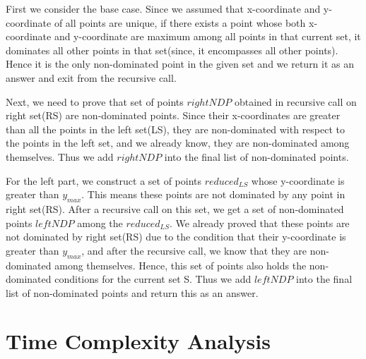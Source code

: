 \documentclass{article}
\begin{document}
First we consider the base case. Since we assumed that x-coordinate and y-coordinate of all points are unique, if there exists a point whose both x-coordinate and y-coordinate are maximum among all points in that current set, it dominates all other points in that set(since, it encompasses all other points). Hence it is the only non-dominated point in the given set and we return it as an answer and exit from the recursive call.
\par
Next, we need to prove that set of points $rightNDP$ obtained in recursive call on right set(RS) are non-dominated points. Since their x-coordinates are greater than all the points in the left set(LS), they are non-dominated with respect to the points in the left set, and we already know, they are non-dominated among themselves. Thus we add $rightNDP$ into the final list of non-dominated points.
\par
For the left part, we construct a set of points $reduced_{LS}$ whose y-coordinate is greater than $y_{max}$. This means these points are not dominated by any point in right set(RS). After a recursive call on this set, we get a set of non-dominated points $leftNDP$ among the $reduced_{LS}$. We already proved that these points are not dominated by right set(RS) due to the condition that their y-coordinate is greater than $y_{max}$, and after the recursive call, we know that they are non-dominated among themselves. Hence, this set of points also holds the non-dominated conditions for the current set S. Thus we add $leftNDP$ into the final list of non-dominated points and return this as an answer.
\newpage
\section {Time Complexity Analysis}
\end{document}
